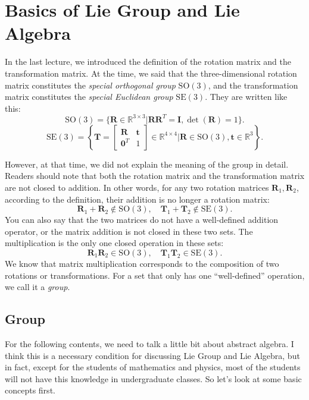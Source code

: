 \section{Basics of Lie Group and Lie Algebra}
In the last lecture, we introduced the definition of the rotation matrix and the transformation matrix. At the time, we said that the three-dimensional rotation matrix constitutes the \textit{special orthogonal group} $\mathrm{SO}(3)$, and the transformation matrix constitutes the \textit{special Euclidean group} $\mathrm{SE}(3) $. They are written like this:
\begin{equation}
\mathrm{SO}(3) = \{ \mathbf{R} \in \mathbb{R}^{3 \times 3} | \mathbf{RR}^T = \mathbf{I}, \det(\mathbf{R})=1 \}.
\end{equation}
\begin{equation}
\mathrm{SE}(3) = \left\{ \mathbf{T} = \left[ {\begin{array}{*{20}{c}}
    \mathbf{R} & \mathbf{t} \\
    {{\mathbf{0}^T}} & 1
    \end{array}} \right]
\in \mathbb{R}^{4 \times 4} | \mathbf{R} \in \mathrm{SO}(3), \mathbf{t} \in \mathbb{R}^3\right\}.
\end{equation}

However, at that time, we did not explain the meaning of the group in detail. Readers should note that both the rotation matrix and the transformation matrix are not closed to addition. In other words, for any two rotation matrices $\mathbf{R}_1, \mathbf{R}_2$, according to the definition, their addition is no longer a rotation matrix:
\begin{equation}
\mathbf{R}_1 + \mathbf{R}_2 \notin \mathrm{SO}(3), \quad \mathbf{T}_1 + \mathbf{T}_2 \notin \mathrm{SE}(3).
\end{equation}
You can also say that the two matrices do not have a well-defined addition operator, or the matrix addition is not closed in these two sets. The multiplication is the only one closed operation in these sets:
\begin{equation}
\mathbf{R}_1 \mathbf{R}_2 \in \mathrm{SO}(3), \quad \mathbf{T}_1 \mathbf{T}_2 \in \mathrm{SE}(3).
\end{equation}
We know that matrix multiplication corresponds to the composition of two rotations or transformations. For a set that only has one ``well-defined'' operation, we call it a \textit{group}.

\subsection{Group}
For the following contents, we need to talk a little bit about abstract algebra. I think this is a necessary condition for discussing Lie Group and Lie Algebra, but in fact, except for the students of mathematics and physics, most of the students will not have this knowledge in undergraduate classes. So let's look at some basic concepts first.

